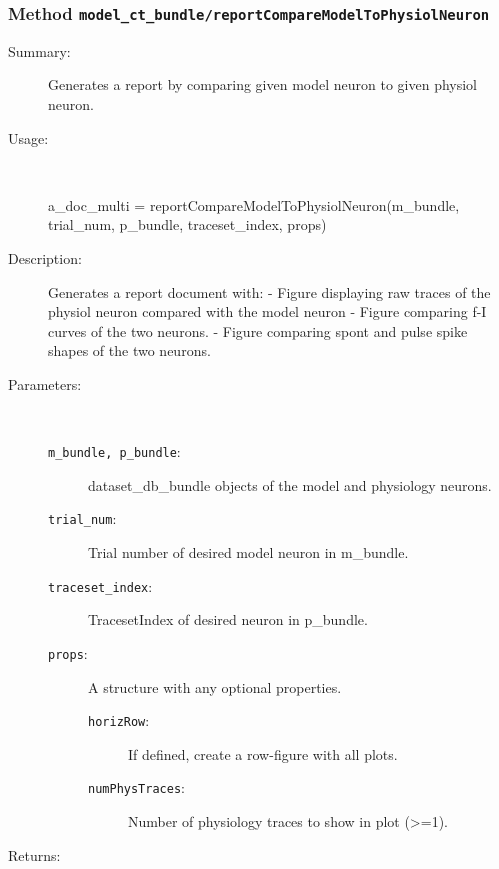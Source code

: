 \subsubsection[Method \texttt{reportCompareModelToPhysiolNeuron}]{Method \texttt{model\_ct\_bundle/reportCompareModelToPhysiolNeuron}}%
%
\label{ref_model_ct_bundle__reportCompareModelToPhysiolNeuron}%
\hypertarget{ref_model_ct_bundle__reportCompareModelToPhysiolNeuron}{}%
\begin{description}
\item[Summary:]Generates a report by comparing given model neuron to given physiol neuron.
%
\item[Usage:]~%
\begin{lyxcode}%
a\_doc\_multi = reportCompareModelToPhysiolNeuron(m\_bundle, trial\_num, p\_bundle, 
						  traceset\_index, props)
%
\end{lyxcode}%
%
\item[Description:]%
Generates a report document with:
	- Figure displaying raw traces of the physiol neuron compared with the model neuron
	- Figure comparing f-I curves of the two neurons.
	- Figure comparing spont and pulse spike shapes of the two neurons.
\item[Parameters:]~
\begin{description}%
\item[\texttt{m\_bundle, p\_bundle}:]
 dataset\_db\_bundle objects of the model and physiology neurons.
\item[\texttt{trial\_num}:]
 Trial number of desired model neuron in m\_bundle.
\item[\texttt{traceset\_index}:]
 TracesetIndex of desired neuron in p\_bundle.
\item[\texttt{props}:]
 A structure with any optional properties.
\begin{description}%
\item[\texttt{horizRow}:]
 If defined, create a row-figure with all plots.
\item[\texttt{numPhysTraces}:]
 Number of physiology traces to show in plot (>=1).
\end{description}%
\end{description}%
%
\item[Returns:
]~


\end{description}
